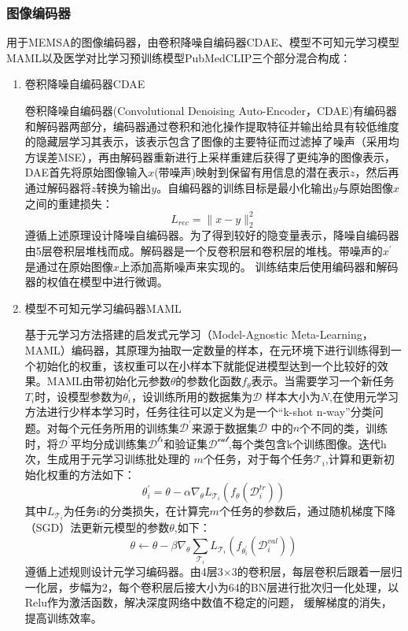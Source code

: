 \subsubsection*{图像编码器}
用于MEMSA的图像编码器，由卷积降噪自编码器CDAE、模型不可知元学习模型MAML以及医学对比学习预训练模型PubMedCLIP三个部分混合构成：
\begin{enumerate}[topsep = 0 pt, itemsep= 0 pt, parsep=0pt, partopsep=0pt, leftmargin=44pt, itemindent=0pt, labelsep=6pt, label=(\arabic*)]
	\item 卷积降噪自编码器CDAE
	
	卷积降噪自编码器(Convolutional Denoising Auto-Encoder，CDAE)有编码器和解码器两部分，编码器通过卷积和池化操作提取特征并输出给具有较低维度的隐藏层学习其表示，该表示包含了图像的主要特征而过滤掉了噪声（采用均方误差MSE），再由解码器重新进行上采样重建后获得了更纯净的图像表示，
	DAE首先将原始图像输入$x$(带噪声)映射到保留有用信息的潜在表示$z$，然后再通过解码器将$z$转换为输出$y$。自编码器的训练目标是最小化输出$y$与原始图像$x$之间的重建损失：
	\begin{equation}
		\label{}
		L_{r e c}=\|x-y\|_2^2	
	\end{equation}
	遵循上述原理设计降噪自编码器。为了得到较好的隐变量表示，降噪自编码器由5层卷积层堆栈而成。解码器是一个反卷积层和卷积层的堆栈。带噪声的$x^{\prime}$是通过在原始图像$x$上添加高斯噪声来实现的。
	训练结束后使用编码器和解码器的权值在模型中进行微调。

	\item 模型不可知元学习编码器MAML
	
	基于元学习方法搭建的启发式元学习（Model-Agnostic Meta-Learning，MAML）编码器，其原理为抽取一定数量的样本，在元环境下进行训练得到一个初始化的权重，该权重可以在小样本下就能促进模型达到一个比较好的效果。MAML由带初始化元参数$\theta$的参数化函数$f_\theta$表示。当需要学习一个新任务$T_i$时，设模型参数为$\theta_i^{\prime}$，设训练所用的数据集为$\mathcal{D}$
	样本大小为$N$,在使用元学习方法进行少样本学习时，任务往往可以定义为是一个“k-shot n-way”分类问题。对每个元任务所用的训练集$\mathcal{D^{\prime}}$来源于数据集$\mathcal{D}$
	中的$n$个不同的类，训练时，将$\mathcal{D^{\prime}}$平均分成训练集$\mathcal{D^{tr}}$和验证集$\mathcal{D^{val}}$,每个类包含k个训练图像。迭代h次，生成用于元学习训练批处理的
	$m$个任务，对于每个任务$\mathcal{T}_i$,计算和更新初始化权重的方法如下：
	\begin{equation}
		\label{}
		\theta_i^{\prime}=\theta-\alpha \nabla_\theta L_{\mathcal{T}_i}\left(f_\theta\left(\mathcal{D}_i^{t r}\right)\right)
	\end{equation}
	其中$L_{\mathcal{T}_i}$为任务i的分类损失，在计算完$m$个任务的参数后，通过随机梯度下降（SGD）法更新元模型的参数$\theta$,如下：
	\begin{equation}
		\label{}
		\theta \leftarrow \theta-\beta \nabla_\theta \sum_{\mathcal{T}_i} L_{\mathcal{T}_i}\left(f_{\theta_i^{\prime}}\left(\mathcal{D}_i^{v a l}\right)\right)
	\end{equation}
	遵循上述规则设计元学习编码器。由4层3×3的卷积层，每层卷积后跟着一层归一化层，步幅为2，每个卷积层后接大小为64的BN层进行批次归一化处理，以Relu作为激活函数，解决深度网络中数值不稳定的问题，
	缓解梯度的消失，提高训练效率。


\end{enumerate}

